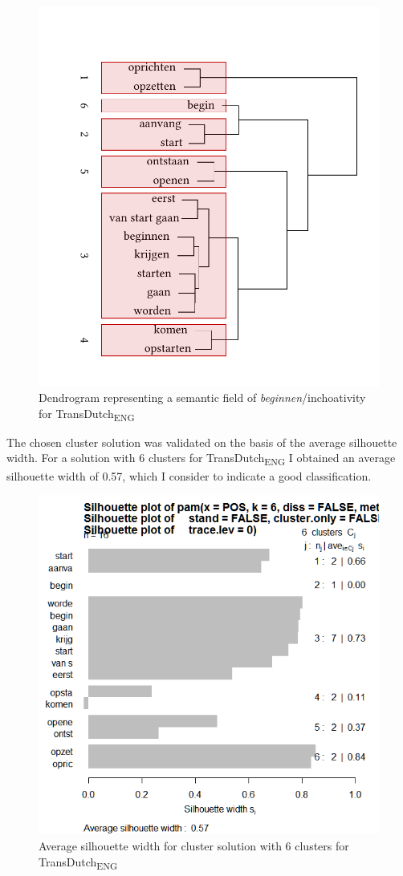 \begin{figure}
\includegraphics[width=.75\textwidth,trim=0 20 0 50]{figures/tree65.pdf}
\caption{\label{fig:4:64}Dendrogram representing a semantic field of \textit{beginnen}/inchoativity for TransDutch\textsubscript{ENG}}
\end{figure}

The chosen cluster solution was validated on the basis of the average silhouette width. For a solution with 6 clusters for TransDutch\textsubscript{ENG} I obtained an average silhouette width of 0.57, which I consider to indicate a good classification.

\begin{figure}
\includegraphics[height=.4\textheight]{figures/Vandevoorde2-img66.png}
\caption{\label{fig:4:65}Average silhouette width for cluster solution with 6 clusters for TransDutch\textsubscript{ENG}}
\end{figure}

